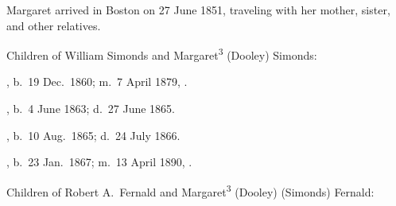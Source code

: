 Margaret arrived in Boston on 27 June 1851, traveling with her mother, sister, and other relatives.\cite{Chascay:9}

\begin{KidsIntro}
	Children of William Simonds and Margaret\textsuperscript{3} (Dooley) Simonds:
\end{KidsIntro}

\begin{Kids}
	
	, b.\ 19 Dec.\ 1860; m.\ 7 April 1879, .
	
	, b.\ 4 June 1863;\cite{Francis4SimondsBirth} d.\ 27 June 1865.\cite{Francis4SimondsDeath}
	
	, b.\ 10 Aug.\ 1865;\cite{Margaret4SimondsBirth} d.\ 24 July 1866.\cite{Margaret4SimondsDeath}
	
	, b.\ 23 Jan.\ 1867; m.\ 13 April 1890, .

\end{Kids}
	
\begin{KidsIntro}
	Children of Robert A.\ Fernald and Margaret\textsuperscript{3} (Dooley) (Simonds) Fernald:
\end{KidsIntro}	

